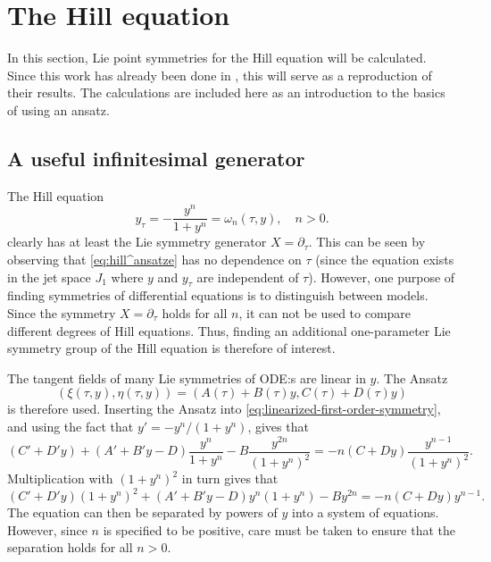 \section{The Hill equation} \label{sec:hill-ansatze}

In this section, Lie point symmetries for the Hill equation will be calculated.
Since this work has already been done in \cite{ohlsson2020symmetry}, this will serve as a reproduction of their results.
The calculations are included here as an introduction to the basics of using an ansatz.

\subsection{A useful infinitesimal generator}

The Hill equation
\begin{equation} \label{eq:hill^ansatze}
  y_\tau = - \frac{y^n}{1 + y^n} = \omega_n(\tau, y), \quad
  n > 0.
\end{equation}
clearly has at least the Lie symmetry generator \(X=\partial_\tau\).
This can be seen by observing that \cref{eq:hill^ansatze} has no dependence on \(\tau\) (since the equation exists in the jet space \(J_1\) where \(y\) and \(y_\tau\) are independent of \(\tau\)).
However, one purpose of finding symmetries of differential equations is to distinguish between models.
Since the symmetry \(X=\partial_\tau\) holds for all \(n\), it can not be used to compare different degrees of Hill equations.
Thus, finding an additional one-parameter Lie symmetry group of the Hill equation is therefore of interest.

The tangent fields of many Lie symmetries of ODE:s are linear in \(y\).
The Ansatz
\begin{equation*}
  \left(\xi(\tau,y),\eta(\tau,y)\right) = \left(A(\tau) + B(\tau)y,C(\tau) + D(\tau)y\right)
\end{equation*}
is therefore used.
Inserting the Ansatz into \cref{eq:linearized-first-order-symmetry}, and using the fact that \(y' = - y^n / (1 + y^n)\), gives that
\begin{equation*}
  (C' + D'y) + (A' + B'y - D) \frac{y^n}{1 + y^n} - B \frac{y^{2n}}{(1 + y^n)^2} =
  -n(C + Dy) \frac{y^{n-1}}{(1 + y^n)^2}.
\end{equation*}
Multiplication with \((1 + y^n)^2\) in turn gives that
\begin{equation} \label{eq:hill-linear-symmetry}
  (C' + D'y)(1 + y^n)^2 + (A' + B'y - D)y^n(1 + y^n) - By^{2n} =
  -n(C + Dy) y^{n-1}.
\end{equation}
The equation can then be separated by powers of \(y\) into a system of equations.
However, since \(n\) is specified to be positive, care must be taken to ensure that the separation holds for all \(n>0\).

